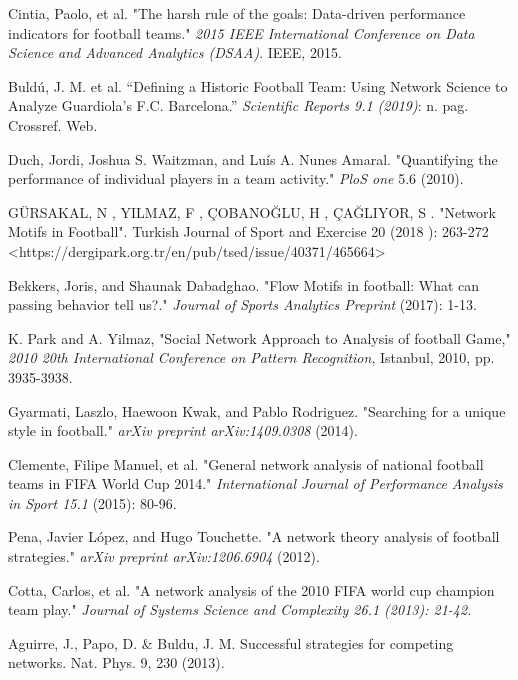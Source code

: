 \documentclass{mcmthesis}
\begin{document}
\begin{thebibliography}{9}


Cintia, Paolo, et al. "The harsh rule of the goals: Data-driven performance indicators for football teams." \textit{2015 IEEE International Conference on Data Science and Advanced Analytics (DSAA)}. IEEE, 2015.

Buldú, J. M. et al. “Defining a Historic Football Team: Using Network Science to Analyze Guardiola’s F.C. Barcelona.” \textit{Scientific Reports 9.1 (2019)}: n. pag. Crossref. Web.

Duch, Jordi, Joshua S. Waitzman, and Luís A. Nunes Amaral. "Quantifying the performance of individual players in a team activity." \textit{PloS one} 5.6 (2010).

GÜRSAKAL, N , YILMAZ, F , ÇOBANOĞLU, H , ÇAĞLIYOR, S . "Network Motifs in Football". Turkish Journal of Sport and Exercise 20 (2018 ): 263-272 <https://dergipark.org.tr/en/pub/tsed/issue/40371/465664>

Bekkers, Joris, and Shaunak Dabadghao. "Flow Motifs in football: What can passing behavior tell us?." \textit{Journal of Sports Analytics Preprint} (2017): 1-13.

K. Park and A. Yilmaz, "Social Network Approach to Analysis of football Game," \textit{2010 20th International Conference on Pattern Recognition}, Istanbul, 2010, pp. 3935-3938.

Gyarmati, Laszlo, Haewoon Kwak, and Pablo Rodriguez. "Searching for a unique style in football." \textit{arXiv preprint arXiv:1409.0308} (2014).

Clemente, Filipe Manuel, et al. "General network analysis of national football teams in FIFA World Cup 2014." \textit{International Journal of Performance Analysis in Sport 15.1 }(2015): 80-96.

Pena, Javier López, and Hugo Touchette. "A network theory analysis of football strategies." \textit{arXiv preprint arXiv:1206.6904 }(2012).

Cotta, Carlos, et al. "A network analysis of the 2010 FIFA world cup champion team play." \textit{Journal of Systems Science and Complexity 26.1 (2013): 21-42.}

Aguirre, J., Papo, D. \& Buldu, J. M. Successful strategies for competing networks. Nat. Phys. 9, 230 (2013). 

\end{thebibliography}
\end{document}
